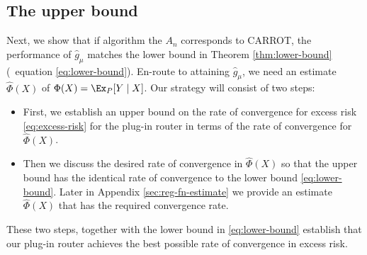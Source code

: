 \subsection{The upper bound }\label{sec:upper-bound}
Next, we show that if algorithm the $A_n$ corresponds to CARROT, the performance of $\hat{g}_{\mu}$ matches the lower bound in Theorem \ref{thm:lower-bound} (\cf\ equation \ref{eq:lower-bound}). En-route to attaining $\hat{g}_{\mu}$, we need an estimate $\widehat \Phi(X)$ of $\Phi(X) = \Ex_P[Y \mid X ]$. %
Our strategy will consist of two steps: 
\begin{itemize}
    \item First,  we establish an upper bound on the rate of convergence for excess risk \eqref{eq:excess-risk} for the plug-in router in terms of the rate of convergence for $\widehat \Phi(X)$. 
    \item Then we discuss the desired rate of convergence in $\widehat \Phi(X)$ so that the upper bound has the identical rate of convergence to the lower bound \eqref{eq:lower-bound}. Later in Appendix \ref{sec:reg-fn-estimate} we provide an estimate $\widehat \Phi(X)$ that has the required convergence rate. 
\end{itemize}
These two steps, together with the lower bound in \eqref{eq:lower-bound} establish that our plug-in router achieves the best possible rate of convergence in excess risk. 

